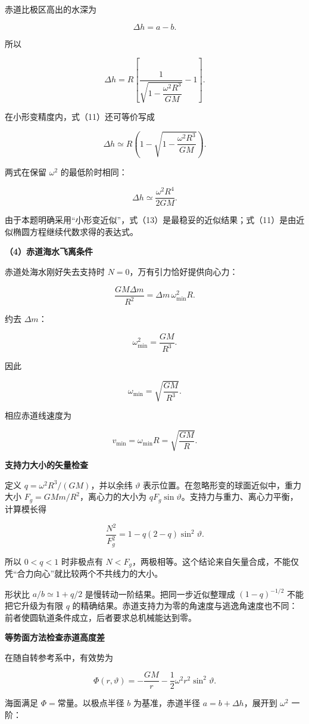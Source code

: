 \documentclass[12pt,a4paper,UTF8]{ctexart}
\begin{document}
赤道比极区高出的水深为

\[
\Delta h=a-b.
\]

所以

\[
\boxed{
\Delta h
=R\left[
\frac1{\sqrt{1-\dfrac{\omega^2R^3}{GM}}}-1
\right]
}.
\tag{11}
\]

在小形变精度内，式（11）还可等价写成

\[
\Delta h
\simeq R\left(1-\sqrt{1-\frac{\omega^2R^3}{GM}}\right).
\tag{12}
\]

两式在保留 \(\omega^2\) 的最低阶时相同：

\[
\Delta h\simeq\frac{\omega^2R^4}{2GM}.
\tag{13}
\]

由于本题明确采用``小形变近似''，式（13）是最稳妥的近似结果；式（11）是由近似椭圆方程继续代数求得的表达式。

\textbf{（4）赤道海水飞离条件}

赤道处海水刚好失去支持时 \(N=0\)，万有引力恰好提供向心力：

\[
\frac{GM\Delta m}{R^2}
=\Delta m\,\omega_{\min}^2R.
\]

约去 \(\Delta m\)：

\[
\omega_{\min}^2=\frac{GM}{R^3}.
\]

因此

\[
\boxed{
\omega_{\min}=\sqrt{\frac{GM}{R^3}}
}.
\tag{14}
\]

相应赤道线速度为

\[
v_{\min}=\omega_{\min}R
=\sqrt{\frac{GM}{R}}.
\tag{15}
\]

\textbf{支持力大小的矢量检查}

定义 \(q=\omega^2R^3/(GM)\)，并以余纬 \(\vartheta\)
表示位置。在忽略形变的球面近似中，重力大小
\(F_g=GMm/R^2\)，离心力的大小为
\(qF_g\sin\vartheta\)。支持力与重力、离心力平衡，计算模长得

\[\frac{N^2}{F_g^2}=1-q(2-q)\sin^2\vartheta.\]

所以 \(0<q<1\) 时非极点有
\(N<F_g\)，两极相等。这个结论来自矢量合成，不能仅凭``合力向心''就比较两个不共线力的大小。

形状比 \(a/b\simeq1+q/2\) 是慢转动一阶结果。把同一步近似整理成
\((1-q)^{-1/2}\) 不能把它升级为有限 \(q\)
的精确结果。赤道支持力为零的角速度与逃逸角速度也不同：前者使圆轨道条件成立，后者要求总机械能达到零。

\textbf{等势面方法检查赤道高度差}

在随自转参考系中，有效势为

\[\Phi(r,\vartheta)=-\frac{GM}{r}-\frac12\omega^2r^2\sin^2\vartheta.\]

海面满足 \(\Phi=\text{常量}\)。以极点半径 \(b\) 为基准，赤道半径
\(a=b+\Delta h\)，展开到 \(\omega^2\) 一阶：
\end{document}
